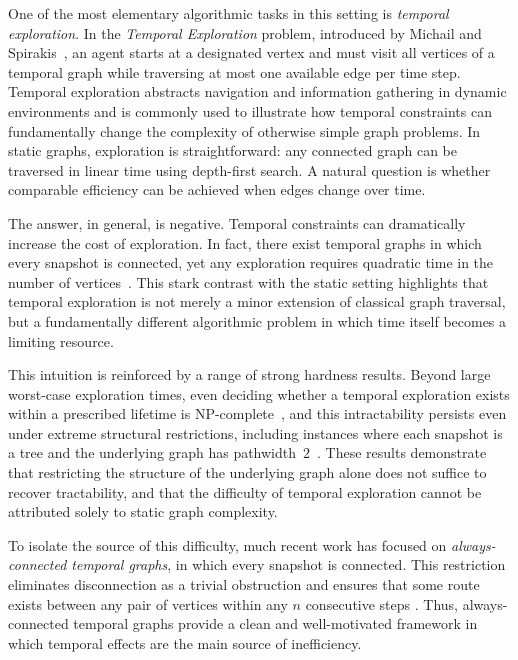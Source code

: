 \documentclass[a4paper,11pt]{article}
\theoremstyle{definition}
\theoremstyle{remark}
\begin{document}
	One of the most elementary algorithmic tasks in this setting is \emph{temporal exploration}. In the \emph{Temporal Exploration} problem, introduced by Michail and Spirakis~\cite{MS16}, an agent starts at a designated vertex and must visit all vertices of a temporal graph while traversing at most one available edge per time step. Temporal exploration abstracts navigation and information gathering in dynamic environments and is commonly used to illustrate how temporal constraints can fundamentally change the complexity of otherwise simple graph problems. In static graphs, exploration is straightforward: any connected graph can be traversed in linear time using depth-first search. A natural question is whether comparable efficiency can be achieved when edges change over time.
	
    The answer, in general, is negative. Temporal constraints can dramatically increase the cost of exploration. 
    In fact, there exist temporal graphs in which every snapshot is connected, yet any exploration requires quadratic time in the number of vertices~\cite{EHK21}. This stark contrast with the static setting highlights that temporal exploration is not merely a minor extension of classical graph traversal, but a fundamentally different algorithmic problem in which time itself becomes a limiting resource.
	
	This intuition is reinforced by a range of strong hardness results. Beyond large worst-case exploration times, even deciding whether a temporal exploration exists within a prescribed lifetime is NP-complete~\cite{MS16}, and this intractability persists even under extreme structural restrictions, including instances where each snapshot is a tree and the underlying graph has pathwidth~$2$~\cite{BZ19}.
	These results demonstrate that restricting the structure of the underlying graph alone does not suffice to recover tractability, and that the difficulty of temporal exploration cannot be attributed solely to static graph complexity.

	To isolate the source of this difficulty, much recent work has focused on \emph{always-connected temporal graphs}, in which every snapshot is connected. This restriction eliminates disconnection as a trivial obstruction and ensures that some route exists between any pair of vertices within any $n$ consecutive steps \cite{MS16}. Thus, always-connected temporal graphs provide a clean and well-motivated framework in which temporal effects are the main source of inefficiency.
	
\end{document}
